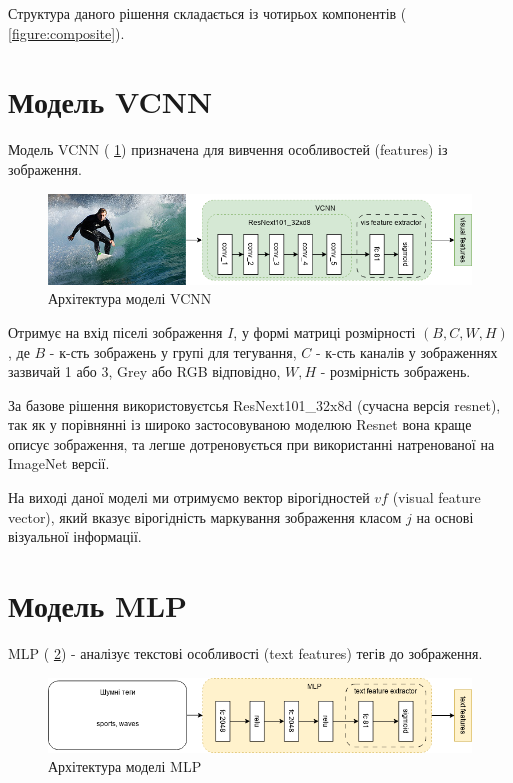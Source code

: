 \documentclass{udstu}
\begin{document}
Структура даного рішення складається із чотирьох компонентів (\figurename{ \ref{figure:composite}}).


\section{Модель VCNN}

Модель VCNN (\figurename{ \ref{figure:vcnn}}) призначена для вивчення особливостей (features) із зображення.

\begin{figure}[!ht]
	\centering
	\includegraphics[width=1.0\textwidth]{PNG/vcnn}
	\caption{Архітектура моделі VCNN}
	\label{figure:vcnn}
\end{figure}

Отримує на вхід піселі зображення $I$, у формі матриці розмірності $(B,C,W,H)$, де
$B$ - к-сть зображень у групі для тегування,
$C$ - к-сть каналів у зображеннях зазвичай 1 або 3, Grey або RGB відповідно,
$W,H$ - розмірність зображень.

За базове рішення використовуєтсья ResNext101\_32x8d \cite{resnext} (сучасна версія resnet),
так як у порівнянні із широко застосовуваною моделюю Resnet \cite{resnet} вона краще описує
зображення, та легше дотреновується при використанні натренованої на ImageNet \cite{deng2009imagenet} версії.

На виході даної моделі ми отримуємо вектор вірогідностей $vf$ (visual feature vector),
який вказує вірогідність маркування зображення класом $j$ на основі візуальної інформації.


\section{Модель MLP}

MLP (\figurename{ \ref{figure:mlp}}) - аналізує текстові особливості (text features) тегів до зображення.

\begin{figure}[!ht]
	\centering
	\includegraphics[width=1.0\textwidth]{PNG/mlp}
	\caption{Архітектура моделі MLP}
	\label{figure:mlp}
\end{figure}
\end{document}
